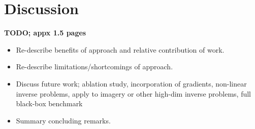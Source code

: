 \chapter{Discussion} \label{chap:discussion}



\textbf{TODO; appx 1.5 pages}

\begin{itemize}
    \item Re-describe benefits of approach and relative contribution of work.
    \item Re-describe limitations/shortcomings of approach.
    \item Discuss future work; ablation study, incorporation of gradients, non-linear inverse problems, apply to imagery or other high-dim inverse problems, full black-box benchmark
    \item Summary concluding remarks.
\end{itemize}
